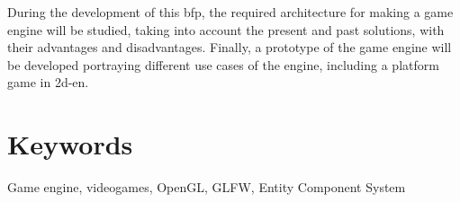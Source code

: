 During the development of this \gls{bfp}, the required architecture for making a game engine will be studied, taking into account
the present and past solutions, with their advantages and disadvantages. Finally, a prototype of the game engine
will be developed portraying different use cases of the engine, including a platform game in \gls{2d-en}.

\section*{Keywords}

Game engine, videogames, OpenGL, GLFW, Entity Component System